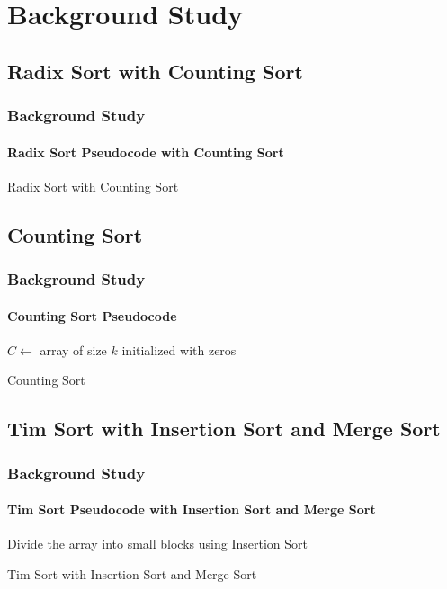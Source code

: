 \documentclass{beamer}
\begin{document}
\section{Background Study}
\subsection{Radix Sort with Counting Sort}
\begin{frame}[t]
    \frametitle{Background Study}
    \framesubtitle{Radix Sort Pseudocode with Counting Sort\cite{hammad2015comparative}}
    \begin{algorithm}[H]
        \SetAlgoLined
        \caption{Radix Sort with Counting Sort}
    \end{algorithm}
\end{frame}


\subsection{Counting Sort}
\begin{frame}[t]
    \frametitle{Background Study}
    \framesubtitle{Counting Sort Pseudocode}
    \small
    \begin{algorithm}[H]
        \SetAlgoLined
        $C \gets$ array of size $k$ initialized with zeros\;
        \caption{Counting Sort}
    \end{algorithm}
\end{frame}

\subsection{Tim Sort with Insertion Sort and Merge Sort}
\begin{frame}[t]
    \frametitle{Background Study}
    \framesubtitle{Tim Sort Pseudocode with Insertion Sort and Merge Sort\cite{jain2015bitonic}}
    \begin{algorithm}[H]
        \SetAlgoLined
        Divide the array into small blocks using Insertion Sort\;
        \caption{Tim Sort with Insertion Sort and Merge Sort}
    \end{algorithm}
\end{frame}
\end{document}
